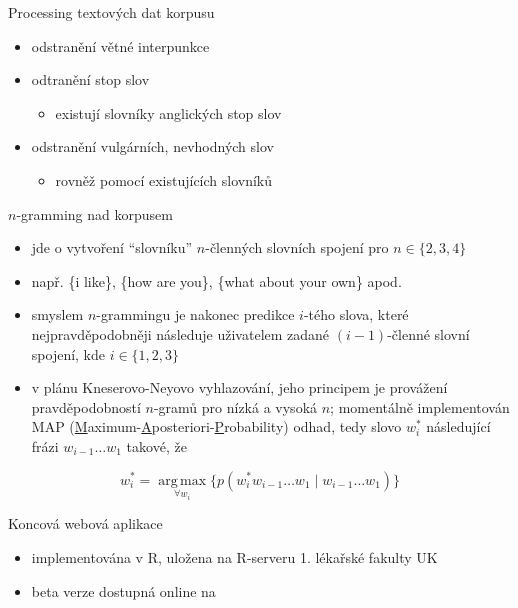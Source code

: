 \documentclass[ignorenonframetext,t]{beamer}
\providecommand{\tightlist}{%
  \setlength{\itemsep}{0pt}\setlength{\parskip}{0pt}}
\DeclareMathOperator*{\argmax}{arg\,max}
\begin{document}
\begin{frame}{Processing textových dat korpusu}

\begin{itemize}
\tightlist
\item
  odstranění větné interpunkce
\item
  odtranění stop slov

  \begin{itemize}
  \tightlist
  \item
    existují slovníky anglických stop slov
  \end{itemize}
\item
  odstranění vulgárních, nevhodných slov

  \begin{itemize}
  \tightlist
  \item
    rovněž pomocí existujících slovníků
  \end{itemize}
\end{itemize}

\end{frame}

\begin{frame}{\(n\)-gramming nad korpusem}

\begin{itemize}
\tightlist
\item
  jde o vytvoření ``slovníku'' \(n\)-členných slovních spojení pro
  \(n \in \{ 2, 3, 4\}\)
\item
  např. \{i like\}, \{how are you\}, \{what about your own\} apod.
\item
  smyslem \(n\)-grammingu je nakonec predikce \(i\)-tého slova, které
  nejpravděpodobněji následuje uživatelem zadané \((i - 1)\)-členné
  slovní spojení, kde \(i \in \{ 1, 2, 3\}\)
\item
  v plánu Kneserovo-Neyovo vyhlazování, jeho principem je provážení
  pravděpodobností \(n\)-gramů pro nízká a vysoká \(n\); momentálně
  implementován MAP
  (\underline{M}aximum-\underline{A}posteriori-\underline{P}robability)
  odhad, tedy slovo \(w_{i}^{*}\) následující frázi
  \(w_{i-1} \ldots w_{1}\) takové, že
\end{itemize}

\[w_{i}^{*} = \argmax\limits_{\forall w_{i}} \{ p( w_{i}^{*} w_{i-1} \ldots w_{1} \mid w_{i-1} \ldots w_{1}) \}\]

\end{frame}

\begin{frame}{Koncová webová aplikace}

\begin{itemize}
\tightlist
\item
  implementována v \textsf{R}, uložena na \textsf{R}-serveru 1. lékařské
  fakulty UK
\item
  beta verze dostupná online na

  \begin{center}
  \href{http://shiny.statest.cz:3838/the_next_word_prediction/}{}
  \end{center}
\end{itemize}

\end{frame}
\end{document}
